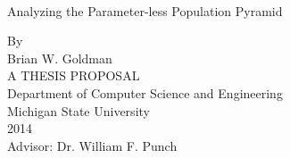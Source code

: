 \documentclass[12pt,letterpaper]{report}
\begin{document}
\sloppy


\begin{titlepage}
\begin{center}
\ \\[1in]%
Analyzing the Parameter-less Population Pyramid\\
\begin{doublespace}
By\\ %
Brian W. Goldman\\[4.5 in]%
A THESIS PROPOSAL\\

Department of Computer Science and Engineering\\
Michigan State University\\
2014\\
Advisor: Dr. William F. Punch\\%
 \end{doublespace}
\end{center}
\end{titlepage}
\newpage







%
%
%
%
\end{document}
